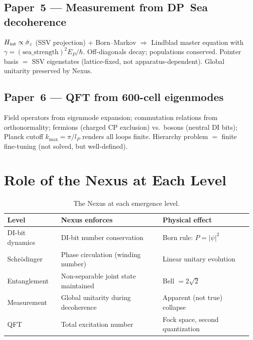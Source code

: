 \documentclass[11pt,a4paper]{article}
\newcommand{\lP}{l_P}
\newcommand{\EP}{E_P}
\begin{document}
\subsection{Paper~5 --- Measurement from DP~Sea
decoherence~\cite{cpp2040d}}

$H_{\rm int} \propto \hat{\sigma}_z$ (SSV projection) + Born--Markov
$\Rightarrow$ Lindblad master equation with $\gamma =
(\text{sea\_strength})^2\EP/\hbar$.  Off-diagonals decay; populations
conserved.  Pointer basis $=$ SSV eigenstates (lattice-fixed, not
apparatus-dependent).  Global unitarity preserved by Nexus.

\subsection{Paper~6 --- QFT from 600-cell
eigenmodes~\cite{cpp2040e}}

Field operators from eigenmode expansion; commutation relations from
orthonormality; fermions (charged CP exclusion) vs.\ bosons (neutral
DI bits); Planck cutoff $k_{\max} = \pi/\lP$ renders all loops finite.
Hierarchy problem $=$ finite fine-tuning (not solved, but well-defined).

\section{Role of the Nexus at Each Level}

\begin{table}[H]
\centering
\caption{The Nexus at each emergence level.}
\begin{tabular}{@{}p{2.8cm}p{5cm}p{5cm}@{}}
\toprule
Level & Nexus enforces & Physical effect \\
\midrule
DI-bit dynamics & DI-bit number conservation & Born rule: $P = |\psi|^2$ \\
Schr\"{o}dinger & Phase circulation (winding number) & Linear unitary evolution \\
Entanglement & Non-separable joint state maintained & Bell $= 2\sqrt{2}$ \\
Measurement & Global unitarity during decoherence & Apparent (not true) collapse \\
QFT & Total excitation number & Fock space, second quantization \\
\bottomrule
\end{tabular}
\end{table}
\end{document}
